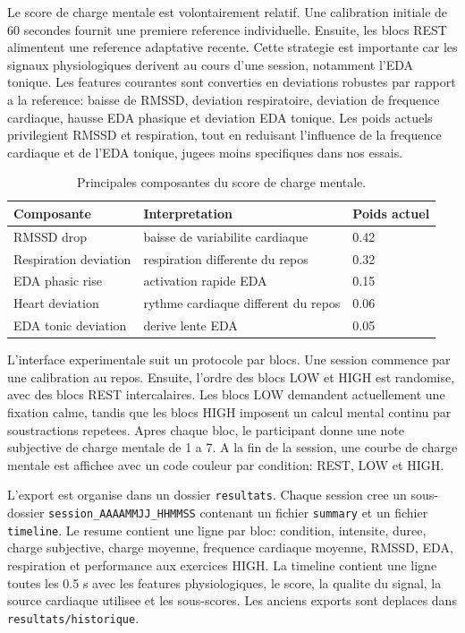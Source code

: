 \documentclass[runningheads]{llncs}
\begin{document}
Le score de charge mentale est volontairement relatif. Une calibration initiale de 60 secondes fournit une premiere reference individuelle. Ensuite, les blocs REST alimentent une reference adaptative recente. Cette strategie est importante car les signaux physiologiques derivent au cours d'une session, notamment l'EDA tonique. Les features courantes sont converties en deviations robustes par rapport a la reference: baisse de RMSSD, deviation respiratoire, deviation de frequence cardiaque, hausse EDA phasique et deviation EDA tonique. Les poids actuels privilegient RMSSD et respiration, tout en reduisant l'influence de la frequence cardiaque et de l'EDA tonique, jugees moins specifiques dans nos essais.

\begin{table}
\centering
\caption{Principales composantes du score de charge mentale.}
\begin{tabular}{lll}
\toprule
Composante & Interpretation & Poids actuel \\
\midrule
RMSSD drop & baisse de variabilite cardiaque & 0.42 \\
Respiration deviation & respiration differente du repos & 0.32 \\
EDA phasic rise & activation rapide EDA & 0.15 \\
Heart deviation & rythme cardiaque different du repos & 0.06 \\
EDA tonic deviation & derive lente EDA & 0.05 \\
\bottomrule
\end{tabular}
\end{table}

L'interface experimentale suit un protocole par blocs. Une session commence par une calibration au repos. Ensuite, l'ordre des blocs LOW et HIGH est randomise, avec des blocs REST intercalaires. Les blocs LOW demandent actuellement une fixation calme, tandis que les blocs HIGH imposent un calcul mental continu par soustractions repetees. Apres chaque bloc, le participant donne une note subjective de charge mentale de 1 a 7. A la fin de la session, une courbe de charge mentale est affichee avec un code couleur par condition: REST, LOW et HIGH.

L'export est organise dans un dossier \texttt{resultats}. Chaque session cree un sous-dossier \texttt{session\_AAAAMMJJ\_HHMMSS} contenant un fichier \texttt{summary} et un fichier \texttt{timeline}. Le resume contient une ligne par bloc: condition, intensite, duree, charge subjective, charge moyenne, frequence cardiaque moyenne, RMSSD, EDA, respiration et performance aux exercices HIGH. La timeline contient une ligne toutes les 0.5 s avec les features physiologiques, le score, la qualite du signal, la source cardiaque utilisee et les sous-scores. Les anciens exports sont deplaces dans \texttt{resultats/historique}.
\end{document}
